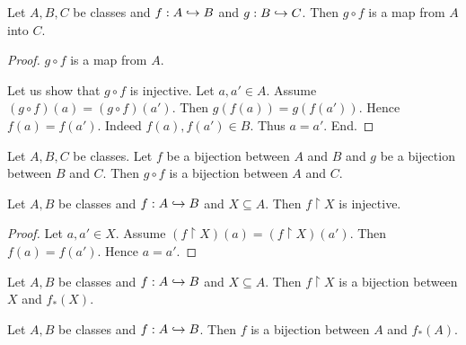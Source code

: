 \documentclass[../../set-theory/set-theory.tex]{subfiles}
\begin{document}
  \begin{forthel}
    \begin{proposition}
      Let $A, B, C$ be classes and $f : A \hookrightarrow B$ and $g : B \hookrightarrow C$.
      Then $g \circ f$ is a map from $A$ into $C$.
    \end{proposition}
    \begin{proof}
      $g \circ f$ is a map from $A$.

      Let us show that $g \circ f$ is injective.
        Let $a, a' \in A$.
        Assume $(g \circ f)(a) = (g \circ f)(a')$.
        Then $g(f(a)) = g(f(a'))$.
        Hence $f(a) = f(a')$.
        Indeed $f(a), f(a') \in B$.
        Thus $a = a'$.
      End.
    \end{proof}
  \end{forthel}

  \begin{forthel}
    \begin{corollary}
      Let $A, B, C$ be classes.
      Let $f$ be a bijection between $A$ and $B$ and $g$ be a bijection between
      $B$ and $C$.
      Then $g \circ f$ is a bijection between $A$ and $C$.
    \end{corollary}
  \end{forthel}

  \begin{forthel}
    \begin{proposition}
      Let $A, B$ be classes and $f : A \hookrightarrow B$ and $X \subseteq A$.
      Then $f \restriction X$ is injective.
    \end{proposition}
    \begin{proof}
      Let $a, a' \in X$.
      Assume $(f \restriction X)(a) = (f \restriction X)(a')$.
      Then $f(a) = f(a')$.
      Hence $a = a'$.
    \end{proof}
  \end{forthel}

  \begin{forthel}
    \begin{proposition}
      Let $A, B$ be classes and $f : A \hookrightarrow B$ and $X \subseteq A$.
      Then $f \restriction X$ is a bijection between $X$ and $f_{*}(X)$.
    \end{proposition}
  \end{forthel}

  \begin{forthel}
    \begin{corollary}
      Let $A, B$ be classes and $f : A \hookrightarrow B$.
      Then $f$ is a bijection between $A$ and $f_{*}(A)$.
    \end{corollary}
  \end{forthel}
\end{document}
